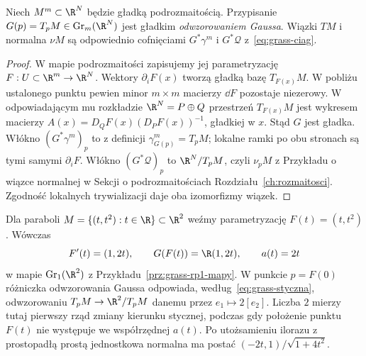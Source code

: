\begin{twierdzenie}
\label{thm:grass-gauss}
Niech $M^m\subset\R^N$ będzie gładką podrozmaitością.
Przypisanie
$G(p)=T_pM\in\operatorname{Gr}_m(\R^N)$
jest gładkim \emph{odwzorowaniem Gaussa}. Wiązki
$TM$ i normalna $\nu M$ są odpowiednio
cofnięciami $G^*\gamma^m$ i $G^*\mathcal Q$
z~\eqref{eq:grass-ciag}.
\end{twierdzenie}
\begin{proof}
W mapie podrozmaitości zapisujemy jej parametryzację
$F:U\subset\R^m\to\R^N$. Wektory
$\partial_iF(x)$ tworzą gładką bazę $T_{F(x)}M$.
W pobliżu ustalonego punktu pewien minor $m\times m$
macierzy $\dd F$ pozostaje niezerowy. W odpowiadającym
mu rozkładzie $\R^N=P\oplus Q$ przestrzeń
$T_{F(x)}M$ jest wykresem macierzy
$A(x)=D_QF(x)(D_PF(x))^{-1}$,
gładkiej w $x$. Stąd $G$ jest gładka.
Włókno $(G^*\gamma^m)_p$ to z definicji
$\gamma^m_{G(p)}=T_pM$; lokalne ramki po obu
stronach są tymi samymi $\partial_iF$.
Włókno $(G^*\mathcal Q)_p$ to
$\R^N/T_pM$, czyli $\nu_pM$ z
Przykładu o wiązce normalnej w Sekcji o podrozmaitościach
Rozdziału~\ref{ch:rozmaitosci}.
Zgodność lokalnych trywializacji daje oba
izomorfizmy wiązek.
\end{proof}

\begin{przyklad}
Dla paraboli $M=\{(t,t^2):t\in\R\}\subset\R^2$
weźmy parametryzację $F(t)=(t,t^2)$. Wówczas
\[
 F'(t)=(1,2t),\qquad
 G(F(t))=\R(1,2t),\qquad a(t)=2t
\]
w mapie $\operatorname{Gr}_1(\R^2)$ z
Przykładu~\ref{prz:grass-rp1-mapy}.
W punkcie $p=F(0)$ różniczka odwzorowania Gaussa
odpowiada, według~\eqref{eq:grass-styczna},
odwzorowaniu $T_pM\to\R^2/T_pM$ danemu przez
$e_1\mapsto2[e_2]$. Liczba $2$ mierzy tutaj
pierwszy rząd zmiany kierunku stycznej, podczas gdy
położenie punktu $F(t)$ nie występuje we współrzędnej $a(t)$.
Po utożsamieniu ilorazu z prostopadłą prostą
jednostkowa normalna ma postać
$(-2t,1)/\sqrt{1+4t^2}$.
\end{przyklad}

